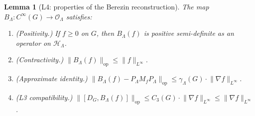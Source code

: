 \documentclass[11pt,a4paper]{article}
\theoremstyle{plain}
\newtheorem{lemma}[theorem]{Lemma}
\theoremstyle{definition}
\newcommand{\Lammax}{\Lambda}
\newcommand{\Hilb}{\mathcal{H}}
\newcommand{\Op}{\mathcal{O}}
\newcommand{\opnorm}[1]{\lVert #1 \rVert_{\mathrm{op}}}
\newcommand{\norm}[1]{\lVert #1 \rVert}
\newcommand{\Dop}{D}
\begin{document}
\begin{lemma}[L4: properties of the Berezin reconstruction]\label{lem:L4}
The map $B_\Lammax: C^\infty(G) \to \Op_\Lammax$ satisfies:
\begin{enumerate}\setlength{\itemsep}{2pt}
\item[(a)] (Positivity.) If $f \ge 0$ on $G$, then $B_\Lammax(f)$ is
positive semi-definite as an operator on $\Hilb_\Lammax$.
\item[(b)] (Contractivity.) $\opnorm{B_\Lammax(f)} \le \norm{f}_{L^\infty}$.
\item[(c)] (Approximate identity.)
$\opnorm{B_\Lammax(f) - P_\Lammax M_f P_\Lammax} \le \gamma_\Lammax(G)
\cdot \norm{\nabla f}_{L^\infty}$.
\item[(d)] (L3 compatibility.) $\opnorm{[\Dop_G, B_\Lammax(f)]} \le
C_3(G) \cdot \norm{\nabla f}_{L^\infty} \le \norm{\nabla f}_{L^\infty}$.
\end{enumerate}
\end{lemma}
\end{document}
